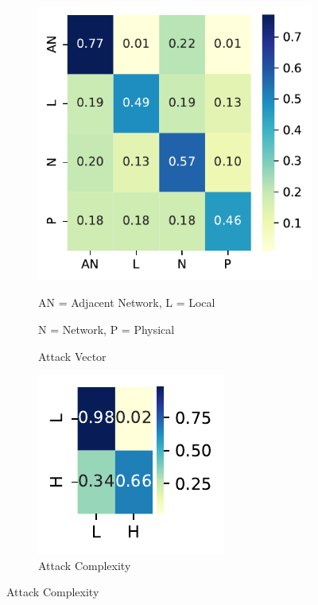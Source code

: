 \documentclass[12pt]{article}
\begin{document}
\begin{figure}
	\centering
	\begin{subfigure}[t]{0.45\textwidth}
		\includegraphics[width=\textwidth]{./figures/confusion_matrices/attack_vector_nvd.pdf}
		\caption{Attack Vector}

		\begin{tablenotes}
			\footnotesize
			\item \quad AN = Adjacent Network, L = Local
			\item \quad N = Network, P = Physical
		\end{tablenotes}
	\end{subfigure}
	\hfill
	\begin{subfigure}[t]{0.45\textwidth}
		\includegraphics[width=\textwidth]{./figures/confusion_matrices/attack_complexity_nvd.pdf}
		\caption{Attack Complexity}


\end{subfigure}
\end{figure}
\end{document}
